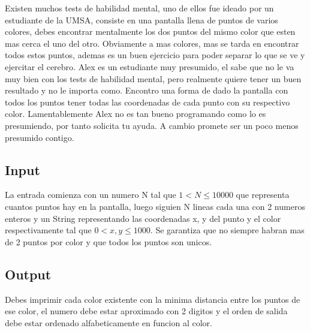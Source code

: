 
Existen muchos tests de habilidad mental, uno de ellos fue ideado por un estudiante de la UMSA, consiste en una pantalla llena de puntos de varios colores, debes encontrar mentalmente los dos puntos del mismo color que esten mas cerca el uno del otro. Obviamente a mas colores, mas se tarda en encontrar todos estos puntos, ademas es un buen ejercicio para poder separar lo que se ve y ejercitar el cerebro. 
Alex es un estudiante muy presumido, el sabe que no le va muy bien con los tests de habilidad mental, pero realmente quiere tener un buen resultado y no le importa como. Encontro una forma de dado la pantalla con todos los puntos tener todas las coordenadas de cada punto con su respectivo color. Lamentablemente Alex no es tan bueno programando como lo es presumiendo, por tanto solicita tu ayuda. A cambio promete ser un poco menos presumido contigo.

\subsection*{Input}

La entrada comienza con un numero N tal que $1 < N \leq 10000$ que representa cuantos puntos hay en la pantalla, luego siguien N lineas cada una con 2 numeros enteros y un String representando las coordenadas x, y del punto y el color respectivamente tal que $0 < x, y \leq 1000$. Se garantiza que no siempre habran mas de 2 puntos por color y que todos los puntos son unicos.

\subsection*{Output}

Debes imprimir cada color existente con la minima distancia entre los puntos de ese color, el numero debe estar aproximado con 2 digitos y el orden de salida debe estar ordenado alfabeticamente en funcion al color.

\datos
